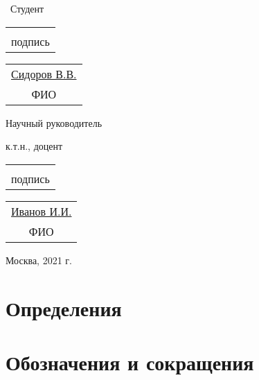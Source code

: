 \documentclass[a4paper,12pt]{report}
\begin{document}
\begin{multicols}{2}
\begin{flushleft}
~Студент\par\:\par
\begin{tabular}{c}
\underline{\hspace{8em}} \vspace{-2mm}\\
{\tiny {\color{graylight}подпись}}
\end{tabular}
\begin{tabular}{c}
\underline{\hspace{2em}Сидоров В.В.\hspace{1em}}\\
{\tiny{\color{graylight} ФИО}}
\end{tabular}
\end{flushleft}

\begin{flushright}
Научный руководитель

к.т.н., доцент
\end{flushright}

\begin{tabular}{c}
\underline{\hspace{8em}} \vspace{-1mm}\\
{\tiny {\color{graylight}подпись}}
\end{tabular}
\begin{tabular}{c}
\underline{\hspace{2em}Иванов И.И.\hspace{1em}} \vspace{-1mm}\\
{\tiny{\color{graylight} ФИО}}
\end{tabular}
\end{multicols}

\vfill
\begin{center}Москва, 2021 г.\end{center}
\newpage
\tableofcontents %

\chapter{Определения}\label{chapter::def}

\chapter{Обозначения и сокращения}
\end{document}
